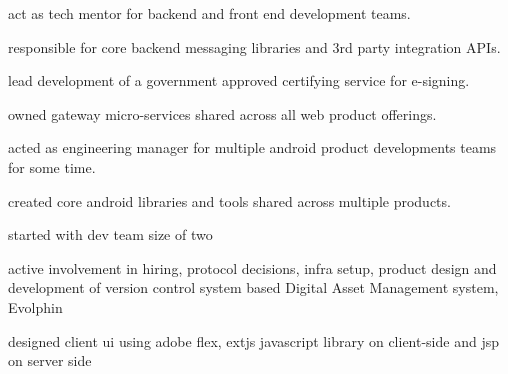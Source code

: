\begin{minipage}[t]{0.66\textwidth}
\sectionspace %


\begin{tightitemize}
\item act as tech mentor for backend and front end development teams.
\item responsible for core backend messaging libraries and 3rd party integration APIs.
\item lead development of a government approved certifying service for e-signing.
\item owned gateway micro-services shared across all web product offerings. 
\item acted as engineering manager for multiple android product developments teams for some time.
\item created core android libraries and tools shared across multiple products.
\end{tightitemize}

\sectionspace %


\begin{tightitemize}
\item started with dev team size of two
\item active involvement in hiring, protocol decisions, infra setup, product design and development of version control system based Digital Asset Management system, Evolphin
\item designed client ui using adobe flex, extjs javascript library on client-side and jsp on server side
\end{tightitemize}






\end{minipage} %
